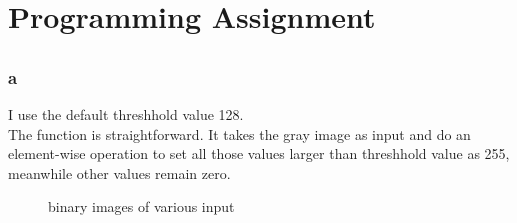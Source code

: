 \documentclass[12pt,letterpaper]{article}
\begin{document}
\newpage
\section{Programming Assignment}

\subsection{}
\subsubsection*{a}
I use the default threshhold value 128.\\
The function is straightforward. It takes the gray image as input and do an element-wise operation 
to set all those values larger than threshhold value as 255, 
meanwhile other values remain zero.
\begin{figure}[htbp]
  \centering
  \caption{binary images of various input}
  \label{binary_img}
\end{figure}
\end{document}
